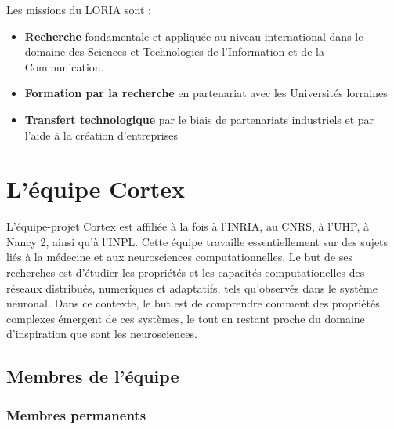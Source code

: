 Les missions du LORIA sont :
\begin{itemize}
   \item \textbf{Recherche} fondamentale et appliquée au niveau international dans le domaine des Sciences et
      Technologies de l'Information et de la Communication.
   \item \textbf{Formation par la recherche} en partenariat avec les Universités lorraines
   \item \textbf{Transfert technologique} par le biais de partenariats industriels et par l'aide à la création
      d'entreprises
\end{itemize}


\section{L'équipe Cortex} %
\label{sec:Cortex}

L'équipe-projet Cortex est affiliée à la fois à l'INRIA, au CNRS, à l'UHP, à Nancy 2,
ainsi qu'à l'INPL. Cette équipe travaille essentiellement sur des sujets liés à la médecine et aux neurosciences
computationnelles.
Le but de ses recherches est d'étudier les propriétés et les capacités computationelles des réseaux distribués,
numeriques et adaptatifs, tels qu'observés dans le système neuronal. Dans ce contexte, le but est de
comprendre comment des propriétés complexes émergent de ces systèmes, le tout en restant proche du domaine
d'inspiration que sont les neurosciences. 

\subsection{Membres de l'équipe} %
\label{sub:Membres de l'équipe}

\subsubsection{Membres permanents} %
\label{ssub:Membres permanents}


